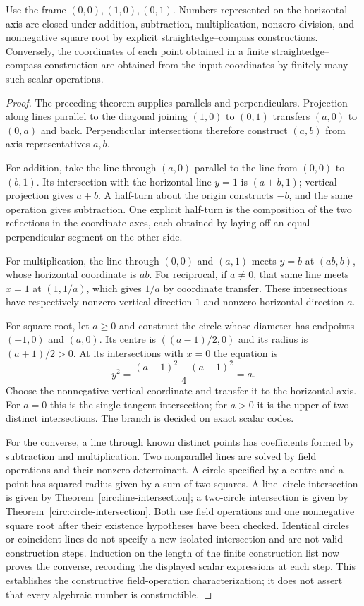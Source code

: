 \begin{theorem}
\label{circ:construction-arithmetic}
Use the frame $(0,0),(1,0),(0,1)$.  Numbers represented on the horizontal
axis are closed under addition, subtraction,
multiplication, nonzero division, and nonnegative square root by explicit
straightedge--compass constructions.  Conversely, the coordinates of each
point obtained in a finite straightedge--compass construction are obtained
from the input coordinates by finitely many such scalar operations.
\end{theorem}
\begin{proof}
The preceding theorem supplies parallels and perpendiculars.  Projection
along lines parallel to the diagonal joining $(1,0)$ to $(0,1)$ transfers
$(a,0)$ to $(0,a)$ and back.  Perpendicular intersections therefore
construct $(a,b)$ from axis representatives $a,b$.

For addition, take the line through $(a,0)$ parallel to the line from
$(0,0)$ to $(b,1)$.  Its intersection with the horizontal line $y=1$ is
$(a+b,1)$; vertical projection gives $a+b$.  A half-turn about the origin
constructs $-b$, and the same operation gives subtraction.  One explicit
half-turn is the composition of the two reflections in the coordinate
axes, each obtained by laying off an equal perpendicular segment on the
other side.

For multiplication, the line through $(0,0)$ and $(a,1)$ meets $y=b$ at
$(ab,b)$, whose horizontal coordinate is $ab$.  For reciprocal, if
$a\ne0$, that same line meets $x=1$ at $(1,1/a)$, which gives $1/a$ by
coordinate transfer.  These intersections have respectively nonzero
vertical direction $1$ and nonzero horizontal direction $a$.

For square root, let $a\ge0$ and construct the circle whose diameter has
endpoints $(-1,0)$ and $(a,0)$.  Its centre is $((a-1)/2,0)$ and its
radius is $(a+1)/2>0$.  At its intersections with $x=0$ the equation is
\[
 y^2=\frac{(a+1)^2-(a-1)^2}{4}=a.
\]
Choose the nonnegative vertical coordinate and transfer it to the
horizontal axis.  For $a=0$ this is the single tangent intersection;
for $a>0$ it is the upper of two distinct intersections.  The branch is
decided on exact scalar codes.

For the converse, a line through known distinct points has coefficients
formed by subtraction and multiplication.  Two nonparallel lines are
solved by field operations and their nonzero determinant.  A circle
specified by a centre and a point has squared radius given by a sum of
two squares.  A line--circle intersection is given by
Theorem~\ref{circ:line-intersection}; a two-circle intersection is given
by Theorem~\ref{circ:circle-intersection}.  Both use field operations and
one nonnegative square root after their existence hypotheses have been
checked.  Identical circles or coincident lines do not specify a new
isolated intersection and are not valid construction steps.
Induction on the length of the finite construction list now proves the
converse, recording the displayed scalar expressions at each step.
This establishes the constructive field-operation characterization; it
does not assert that every algebraic number is constructible.
\end{proof}

